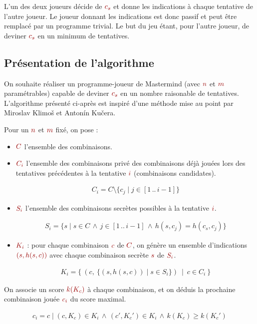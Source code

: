 \documentclass[a4paper]{article}
\newcommand{\isep}{\,..\,}
\renewcommand{\(}{\begin{math}\color{brick}}
\renewcommand{\)}{\end{math}}
\newcommand{\blockmath}[1]{{\color{brick}\begin{align*}#1\end{align*}}}
\newcommand{\nblockmath}[1]{{\color{brick}\begin{align}#1\end{align}}}
\newcommand{\lnd}{\,\land\,}
\begin{document}
L'un des deux joueurs décide de \(c_s\) et donne les indications à
chaque tentative de l'autre joueur. Le joueur donnant les indications est
donc passif et peut être remplacé par un programme trivial. Le but du
jeu étant, pour l'autre joueur, de deviner \(c_s\) en un minimum de
tentatives.

\subsection{Présentation de l'algorithme}

On souhaite réaliser un programme-joueur de Mastermind (avec \(n\) et \(m\) paramétrables) capable de deviner \(c_s\) en un nombre raisonable de tentatives. L'algorithme présenté ci-après est inspiré d'une méthode\cite{sat} mise au point par Miroslav Klimoš et Antonín Kučera.

Pour un \(n\) et \(m\) fixé, on pose :

\begin{itemize}
  
\item \(C\) l'ensemble des combinaisons.
  
\item \(C_i\) l'ensemble des combinaisons privé des combinaisons déjà jouées lors des tentatives précédentes à la tentative \(i\) (combinaisons candidates).
  
  \blockmath{
    C_i = C \setminus \{c_j \mid j \in [1 \isep i-1]\}
  }

\item \(S_i\) l'ensemble des combinaisons secrètes possibles à la tentative \(i\).
  
  \nblockmath{ \label{pred}
    S_i = \{s \mid s \in C \lnd j \in [1 \isep i-1] \lnd h(s,c_j) = h(c_s,c_j)\}
  }

\item \(K_i\) : pour chaque combinaison \(c\) de \(C\), on génère un ensemble d'indications \((s,h(s,c))\) avec chaque combinaison secrète \(s\) de \(S_i\).
  
  \nblockmath{ \label{prod}
    K_i = \{ \ (c, \ \{(s,h(s,c)) \mid s \in S_i\}) \ \mid \ c \in C_i \ \}
  }

\end{itemize}

On associe un score \(k(K_c)\) à chaque combinaison, et on déduis la prochaine combinaison jouée \(c_i\) du score maximal.

\blockmath{
  c_i = c \mid (c,K_c) \in K_i \lnd (c',K_c') \in K_i \lnd k(K_c) \geq k(K_c')
}
\end{document}
